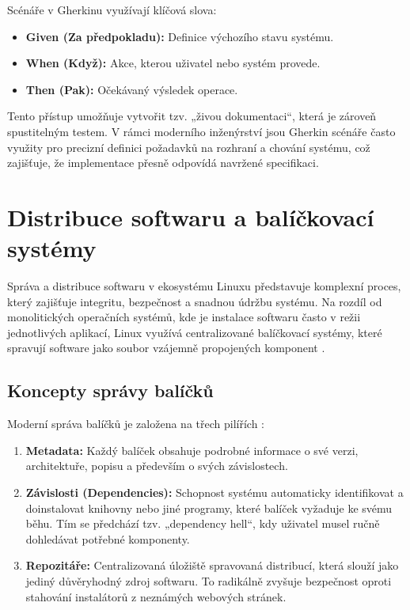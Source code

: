 Scénáře v Gherkinu využívají klíčová slova:
\begin{itemize}
    \item \textbf{Given (Za předpokladu):} Definice výchozího stavu systému.
    \item \textbf{When (Když):} Akce, kterou uživatel nebo systém provede.
    \item \textbf{Then (Pak):} Očekávaný výsledek operace.
\end{itemize}

Tento přístup umožňuje vytvořit tzv. „živou dokumentaci“, která je zároveň spustitelným testem. V rámci moderního inženýrství jsou Gherkin scénáře často využity pro precizní definici požadavků na rozhraní a chování systému, což zajišťuje, že implementace přesně odpovídá navržené specifikaci.

\section{Distribuce softwaru a balíčkovací systémy}
\label{sec:distribuce}
Správa a distribuce softwaru v ekosystému Linuxu představuje komplexní proces, který zajišťuje integritu, bezpečnost a snadnou údržbu systému. Na rozdíl od monolitických operačních systémů, kde je instalace softwaru často v režii jednotlivých aplikací, Linux využívá centralizované balíčkovací systémy, které spravují software jako soubor vzájemně propojených komponent \cite{ward_linux}.

\subsection{Koncepty správy balíčků}
Moderní správa balíčků je založena na třech pilířích \cite{nemeth_admin}:
\begin{enumerate}
    \item \textbf{Metadata:} Každý balíček obsahuje podrobné informace o své verzi, architektuře, popisu a především o svých závislostech.
    \item \textbf{Závislosti (Dependencies):} Schopnost systému automaticky identifikovat a doinstalovat knihovny nebo jiné programy, které balíček vyžaduje ke svému běhu. Tím se předchází tzv. „dependency hell“, kdy uživatel musel ručně dohledávat potřebné komponenty.
    \item \textbf{Repozitáře:} Centralizovaná úložiště spravovaná distribucí, která slouží jako jediný důvěryhodný zdroj softwaru. To radikálně zvyšuje bezpečnost oproti stahování instalátorů z neznámých webových stránek.
\end{enumerate}

